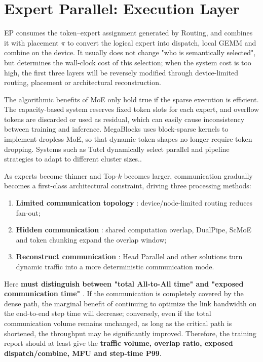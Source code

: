 \documentclass[10pt,a4paper,fontset=none]{ctexart}
\newcommand{\term}[1]{\textbf{#1}}
\begin{document}
\section{Expert Parallel: Execution Layer}

EP consumes the token--expert assignment generated by Routing, and combines it with placement $\pi$ to convert the logical expert into dispatch, local GEMM and combine on the device. It usually does not change "who is semantically selected", but determines the wall-clock cost of this selection; when the system cost is too high, the first three layers will be reversely modified through device-limited routing, placement or architectural reconstruction.

The algorithmic benefits of MoE only hold true if the sparse execution is efficient. The capacity-based system reserves fixed token slots for each expert, and overflow tokens are discarded or used as residual, which can easily cause inconsistency between training and inference. MegaBlocks uses block-sparse kernels to implement dropless MoE, so that dynamic token shapes no longer require token dropping\cite{en:gale2022megablocks}. Systems such as Tutel dynamically select parallel and pipeline strategies to adapt to different cluster sizes.\cite{en:hwang2022tutel}.

As experts become thinner and Top-$k$ becomes larger, communication gradually becomes a first-class architectural constraint, driving three processing methods:
\begin{enumerate}
\item \term{ Limited communication topology }: device/node-limited routing reduces fan-out;
\item \term{ Hidden communication }: shared computation overlap, DualPipe, ScMoE and token chunking expand the overlap window;
\item \term{ Reconstruct communication }: Head Parallel and other solutions turn dynamic traffic into a more deterministic communication mode.
\end{enumerate}

Here \term{ must distinguish between "total All-to-All time" and "exposed communication time" }. If the communication is completely covered by the dense path, the marginal benefit of continuing to optimize the link bandwidth on the end-to-end step time will decrease; conversely, even if the total communication volume remains unchanged, as long as the critical path is shortened, the throughput may be significantly improved. Therefore, the training report should at least give the \textbf{ traffic volume, overlap ratio, exposed dispatch/combine, MFU and step-time P99}.
\end{document}
